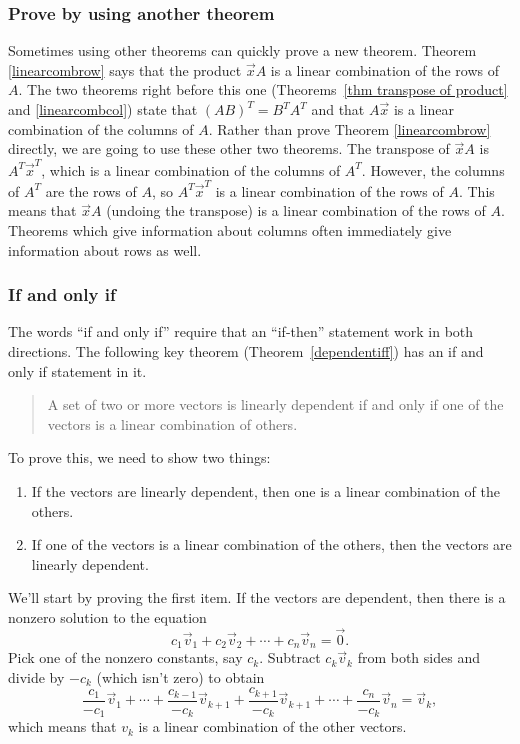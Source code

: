 \subsubsection{Prove by using another theorem}
Sometimes using other theorems can quickly prove a new theorem.  
Theorem \ref{linearcombrow} says that the product $\vec x A$ is a linear combination of the rows of $A$.  
The two theorems right before this one (Theorems~\ref{thm transpose of product} and \ref{linearcombcol}) state that $(AB)^T=B^TA^T$ and that $A\vec x$ is a linear combination of the columns of $A$.  
Rather than prove Theorem \ref{linearcombrow} directly, we are going to use these other two theorems.  
The transpose of $\vec x A$ is $A^T\vec x^T$, which is a linear combination of the columns of $A^T$.  
However, the columns of $A^T$ are the rows of $A$, so $A^T\vec x^T$ is a linear combination of the rows of $A$.  
This means that $\vec x A$ (undoing the transpose) is a linear combination of the rows of $A$. 
Theorems which give information about columns often immediately give information about rows as well.


\subsubsection{If and only if}
The words ``if and only if'' require that an ``if-then'' statement work in both directions.  The following key theorem (Theorem~\ref{dependentiff}) has an if and only if statement in it. 
\begin{quote}
A set of two or more vectors is linearly dependent if and only if one of the vectors is a linear combination of others.  
\end{quote}
To prove this, we need to show two things:
\begin{enumerate}
	\item If the vectors are linearly dependent, then one is a linear combination of the others.
	\item If one of the vectors is a linear combination of the others, then the vectors are linearly dependent.
\end{enumerate}
We'll start by proving the first item.  If the vectors are dependent, then there is a nonzero solution to the equation $$c_1 \vec v_1+c_2\vec v_2+\cdots+c_n\vec v_n=\vec 0.$$ Pick one of the nonzero constants, say $c_k$. Subtract $c_k\vec v_k$ from both sides and divide by $-c_k$ (which isn't zero) to obtain 
$$\frac{c_1}{-c_1}\vec v_1+\cdots+\frac{c_{k-1}}{-c_k}\vec v_{k+1}+\frac{c_{k+1}}{-c_k}\vec v_{k+1}+\cdots+\frac{c_n}{-c_k}\vec v_n=\vec v_k,$$
which means that $v_k$ is a linear combination of the other vectors.

